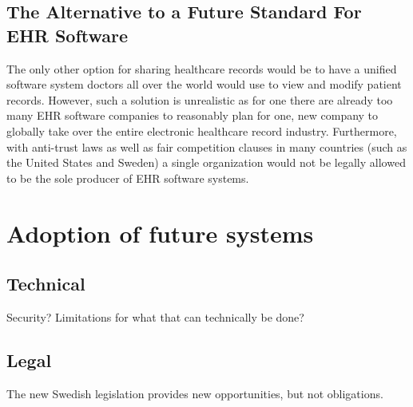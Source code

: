 \documentclass[14pt]{article}
\begin{document}
\subsection{The Alternative to a Future Standard For EHR Software}
The only other option for sharing healthcare records would be to have a unified software system doctors all over the world would use to view and modify patient records. However, such a solution is unrealistic as for one there are already too many \gls{EHR} software companies to reasonably plan for one, new company to globally take over the entire electronic healthcare record industry. Furthermore, with anti-trust laws as well as fair competition clauses in many countries (such as the United States and Sweden) a single organization would not be legally allowed to be the sole producer of \gls{EHR} software systems.



\newpage

\section{Adoption of future systems}
\label{sec:Future}


\subsection{Technical}
Security? Limitations for what that can technically be done?


\subsection{Legal}

The new Swedish legislation provides new opportunities, but not obligations. \cite{RiR19}
\end{document}
